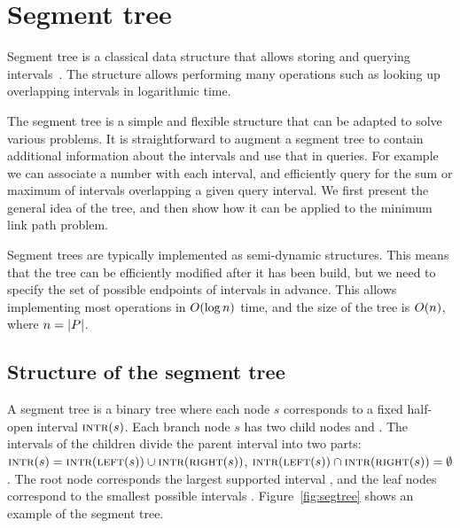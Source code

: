 \documentclass[english,gradu]{tktltiki2018}
\begin{document}
\section{Segment tree}\label{sec:segtree}

Segment tree is a classical data structure that allows storing and querying intervals~\cite{wagner}.
The structure allows performing many operations such as looking up overlapping intervals in logarithmic time.

The segment tree is a simple and flexible structure that can be adapted to solve various problems.
It is straightforward to augment a segment tree to contain additional information about the intervals and use that in queries.
For example we can associate a number with each interval, and efficiently query for the sum or maximum of intervals overlapping a given query interval.
We first present the general idea of the tree, and then show how it can be applied to the minimum link path problem.

Segment trees are typically implemented as semi-dynamic structures.
This means that the tree can be efficiently modified after it has been build, but we need to specify the set of possible endpoints \epts of intervals in advance.
This allows implementing most operations in $O(\log n)$ time, and the size of the tree is $O(n)$, where $n=\left |P\right |$.

\subsection{Structure of the segment tree}

A segment tree is a binary tree where each node $s$ corresponds to a fixed half-open interval $\textsc{intr}(s)$.
Each branch node $s$ has two child nodes  and .
The intervals of the children divide the parent interval into two parts:
$\textsc{intr}(s)=\textsc{intr}(\textsc{left}(s))\cup\textsc{intr}(\textsc{right}(s))$, $\textsc{intr}(\textsc{left}(s))\cap\textsc{intr}(\textsc{right}(s))=\emptyset$.
The root node corresponds the largest supported interval \range{\epts[1]}{\epts[\segsize]}, and the leaf nodes correspond to the smallest possible intervals \range{\epts[i]}{\epts[i+1]}.
Figure~\ref{fig:segtree} shows an example of the segment tree.
\end{document}
